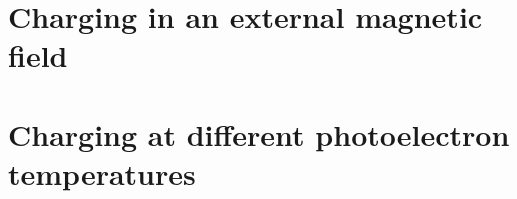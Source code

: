 \section{Charging in an external magnetic field}







\section{Charging at different photoelectron temperatures}